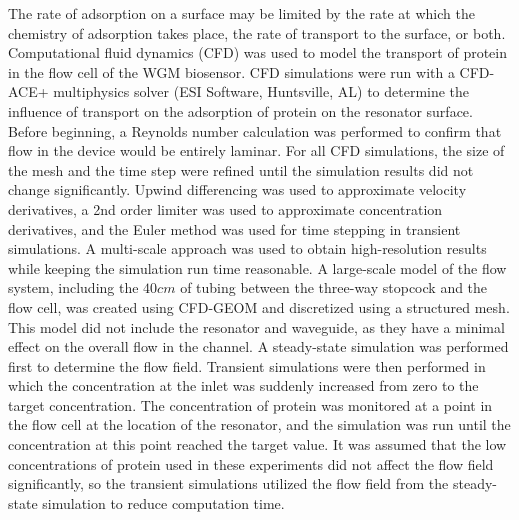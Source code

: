 The rate of adsorption on a surface may be limited by the rate at
which the chemistry of adsorption takes place, the rate of transport
to the surface, or both. Computational fluid dynamics (CFD) was used
to model the transport of protein in the flow cell of the WGM biosensor.
CFD simulations were run with a CFD-ACE+ multiphysics solver (ESI
Software, Huntsville, AL) to determine the influence of transport
on the adsorption of protein on the resonator surface. Before beginning,
a Reynolds number calculation was performed to confirm that flow in
the device would be entirely laminar. For all CFD simulations, the
size of the mesh and the time step were refined until the simulation
results did not change significantly. Upwind differencing was used
to approximate velocity derivatives, a 2nd order limiter was used
to approximate concentration derivatives, and the Euler method was
used for time stepping in transient simulations. A multi-scale approach
was used to obtain high-resolution results while keeping the simulation
run time reasonable. A large-scale model of the flow system, including
the $40cm$ of tubing between the three-way stopcock and the flow
cell, was created using CFD-GEOM and discretized using a structured
mesh. This model did not include the resonator and waveguide, as they
have a minimal effect on the overall flow in the channel. A steady-state
simulation was performed first to determine the flow field. Transient
simulations were then performed in which the concentration at the
inlet was suddenly increased from zero to the target concentration.
The concentration of protein was monitored at a point in the flow
cell at the location of the resonator, and the simulation was run
until the concentration at this point reached the target value. It
was assumed that the low concentrations of protein used in these experiments
did not affect the flow field significantly, so the transient simulations
utilized the flow field from the steady-state simulation to reduce
computation time. 

